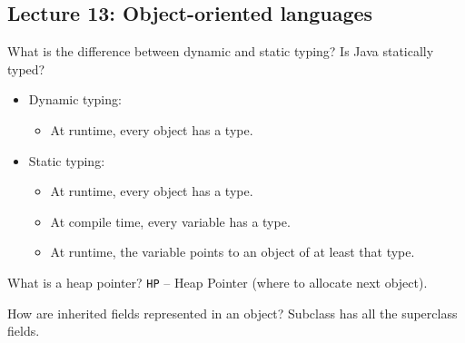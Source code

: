 \documentclass[11pt]{beamer}
\begin{document}
\subsection{Lecture 13: Object-oriented languages}
\begin{frame}
\begin{block}{What is the difference between dynamic and static typing? Is Java statically typed?}
\begin{itemize}
\item Dynamic typing:
\begin{itemize}
\item  At runtime, every object has a type.
\end{itemize}
\item Static typing:
\begin{itemize}
\item At runtime, every object has a type.
\item At compile time, every variable has a type.
\item At runtime, the variable points to an object of at least that type.
\end{itemize}

\end{itemize}
\end{block}

\begin{block}{What is a heap pointer?}
\texttt{HP} – Heap Pointer (where to allocate next object).
\end{block}

\begin{block}{How are inherited fields represented in an object?}
Subclass has all the superclass fields.
\end{block}

\end{frame}
\end{document}
